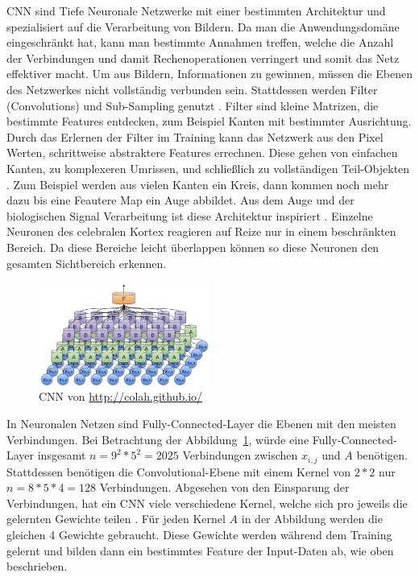 \documentclass[pdftex,a4paper,halfparskip, article]{scrartcl}
\begin{document}
CNN sind Tiefe Neuronale Netzwerke mit einer bestimmten Architektur und spezialisiert auf die Verarbeitung von Bildern. Da man die Anwendungsdomäne eingeschränkt hat, kann man bestimmte Annahmen treffen, welche die Anzahl der Verbindungen und damit Rechenoperationen verringert und somit das Netz effektiver macht. Um aus Bildern, Informationen zu gewinnen, müssen die Ebenen des Netzwerkes nicht vollständig verbunden sein. Stattdessen werden Filter (Convolutions) und Sub-Sampling genutzt \cite{colahsBlogCnn}. Filter sind kleine Matrizen, die bestimmte Features entdecken, zum Beispiel Kanten mit bestimmter Ausrichtung. Durch das Erlernen der Filter im Training kann das Netzwerk aus den Pixel Werten, schrittweise abstraktere Features errechnen. Diese gehen von einfachen Kanten, zu komplexeren Umrissen, und schließlich zu vollständigen Teil-Objekten . Zum Beispiel werden aus vielen Kanten ein Kreis, dann kommen noch mehr dazu bis eine Feautere Map ein Auge abbildet. 
Aus dem Auge und der biologischen Signal Verarbeitung ist diese Architektur inspiriert \cite{Hubel68}. Einzelne Neuronen des celebralen Kortex reagieren auf Reize nur in einem beschränkten Bereich. Da diese Bereiche leicht überlappen können so diese Neuronen den gesamten Sichtbereich erkennen. 

\begin{figure}[h]
\centering
\includegraphics[width=0.5\textwidth]{colah_cnn}
\caption{CNN von \url{http://colah.github.io/}}
\label{fig:colah-cnn}
\end{figure}


In Neuronalen Netzen sind Fully-Connected-Layer die Ebenen mit den meisten Verbindungen. Bei Betrachtung der Abbildung~\ref{fig:colah-cnn}, würde eine Fully-Connected-Layer insgesamt $ n = 9^2 * 5^2 = 2025$ Verbindungen zwischen $x_{i, j}$ und $A$ benötigen. Stattdessen benötigen die Convolutional-Ebene mit einem Kernel von $2*2$ nur $n = 8 * 5 *4 = 128$ Verbindungen. Abgesehen von den Einsparung der Verbindungen, hat ein CNN viele verschiedene Kernel, welche sich pro jeweils die gelernten Gewichte teilen \cite{colahsBlogCnn}. Für jeden Kernel $A$ in der Abbildung werden die gleichen 4 Gewichte gebraucht. Diese Gewichte werden während dem Training gelernt und bilden dann ein bestimmtes Feature der Input-Daten ab, wie oben beschrieben.
\end{document}
